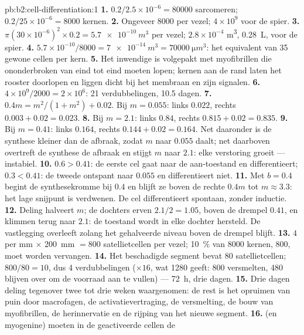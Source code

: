 \begin{solution}{pb:b2:cell-differentiation:1}
\textbf{1.} $0.2/2.5\times 10^{-6} = \num{80000}$ sarcomeren;
$0.2/25\times 10^{-6} = \num{8000}$ kernen.
\textbf{2.} Ongeveer \num{8000} per vezel; $4\times 10^{9}$ voor de
spier.
\textbf{3.} $\pi(30\times 10^{-6})^{2}\times 0.2 = \qty{5.7e-10}{m^3}$
per vezel; $2.8\times 10^{-4}$ \unit{m^3}, \qty{0.28}{L}, voor de
spier.
\textbf{4.} $5.7\times 10^{-10}/8000 = \qty{7e-14}{m^3} =
\qty{70000}{\micro m^3}$: het equivalent van 35 gewone cellen per kern.
\textbf{5.} Het inwendige is volgepakt met myofibrillen die ononderbroken
van eind tot eind moeten lopen; kernen aan de rand laten het rooster
doorlopen en liggen dicht bij het membraan en zijn signalen.
\textbf{6.} $4\times 10^{9}/2000 = 2\times 10^{6}$: 21 verdubbelingen, 10.5
dagen.
\textbf{7.} $0.4m = m^{2}/(1 + m^{2}) + 0.02$. Bij $m = 0.055$: links
$0.022$, rechts $0.003 + 0.02 = 0.023$.
\textbf{8.} Bij $m = 2.1$: links $0.84$, rechts $0.815 + 0.02 = 0.835$.
\textbf{9.} Bij $m = 0.41$: links $0.164$, rechts $0.144 + 0.02 = 0.164$.
Net daaronder is de synthese kleiner dan de afbraak, zodat $m$ naar $0.055$
daalt; net daarboven overtreft de synthese de afbraak en stijgt $m$ naar
$2.1$: elke verstoring groeit --- instabiel.
\textbf{10.} $0.6 > 0.41$: de eerste cel gaat naar de aan-toestand en
differentieert; $0.3 < 0.41$: de tweede ontspant naar $0.055$ en
differentieert niet.
\textbf{11.} Met $b = 0.4$ begint de synthesekromme bij $0.4$ en blijft ze
boven de rechte $0.4m$ tot $m \approx 3.3$: het lage snijpunt is verdwenen.
De cel differentieert spontaan, zonder inductie.
\textbf{12.} Deling halveert $m$; de dochters erven $2.1/2 =
1.05$, boven de drempel $0.41$, en klimmen terug naar $2.1$: de toestand
wordt in elke dochter hersteld. De vastlegging overleeft zolang het
gehalveerde niveau boven de drempel blijft.
\textbf{13.} $4$ per mm $\times$ \qty{200}{mm} $= 800$ satellietcellen
per vezel; \qty{10}{\%} van \num{8000} kernen, \num{800}, moet worden
vervangen.
\textbf{14.} Het beschadigde segment bevat $80$ satellietcellen; $800/80 =
10$, dus 4 verdubbelingen ($\times 16$, wat \num{1280} geeft: 800
versmelten, 480 blijven over om de voorraad aan te vullen) --- \qty{72}{h},
drie dagen.
\textbf{15.} Drie dagen deling tegenover twee tot drie weken waargenomen:
de rest is het opruimen van puin door macrofagen, de activatievertraging,
de versmelting, de bouw van myofibrillen, de herinnervatie en de rijping
van het nieuwe segment.
\textbf{16.}  (en myogenine) moeten in de geactiveerde cellen de

\end{solution}
